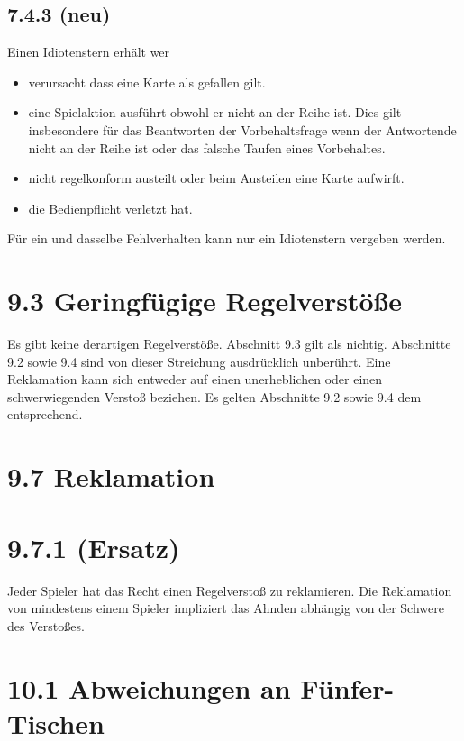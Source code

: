 \subsection*{7.4.3 (neu)}

Einen Idiotenstern erhält wer
\begin{itemize}
    \item{verursacht dass eine Karte als gefallen gilt.}
    \item{eine Spielaktion ausführt obwohl er nicht an der Reihe ist. Dies gilt
        insbesondere für das Beantworten der Vorbehaltsfrage wenn der
        Antwortende nicht an der Reihe ist oder das falsche Taufen eines
        Vorbehaltes.}
    \item{nicht regelkonform austeilt oder beim Austeilen eine Karte aufwirft.}
    \item{die Bedienpflicht verletzt hat.}
\end{itemize}

Für ein und dasselbe Fehlverhalten kann nur ein Idiotenstern vergeben werden.

\clearpage

\section*{9.3 Geringfügige Regelverstöße}

Es gibt keine derartigen Regelverstöße. Abschnitt 9.3 gilt als nichtig.
Abschnitte 9.2 sowie 9.4 sind von dieser Streichung ausdrücklich unberührt.
Eine Reklamation kann sich entweder auf einen unerheblichen oder einen
schwerwiegenden Verstoß beziehen. Es gelten Abschnitte 9.2 sowie 9.4 dem
entsprechend.

\section*{9.7 Reklamation}

\section*{9.7.1 (Ersatz)}

Jeder Spieler hat das Recht einen Regelverstoß zu reklamieren. Die Reklamation
von mindestens einem Spieler impliziert das Ahnden abhängig von der Schwere des
Verstoßes.

\section*{10.1 Abweichungen an Fünfer-Tischen}

